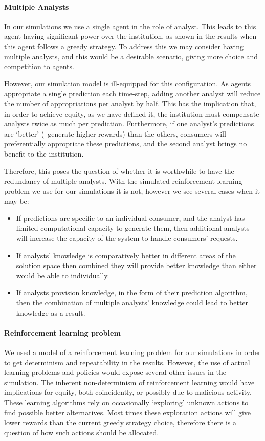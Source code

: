 \paragraph{Multiple Analysts}  In our simulations we use a single agent in the
role of analyst. This leads to this agent having significant power over the
institution, as shown in the results when this agent follows a greedy
strategy. To address this we may consider having multiple analysts, and this
would be a desirable scenario, giving more choice and competition to agents.

However, our simulation model is ill-equipped for this configuration. As
agents appropriate a single prediction each time-step, adding another
analyst will reduce the number of appropriations per analyst by half. This has
the implication that, in order to achieve equity, as we have defined it, the
institution must compensate analysts twice as much per prediction.
Furthermore, if one analyst's predictions are `better' (\ie\ generate higher rewards) than the others, consumers will preferentially appropriate these
predictions, and the second analyst brings no benefit to the institution.

Therefore, this poses the question of whether it is worthwhile to have the
redundancy of multiple analysts. With the simulated reinforcement-learning
problem we use for our simulations it is not, however we see several cases when
it may be:

\begin{itemize}
\item If predictions are specific to an individual consumer, and the analyst has limited computational capacity to generate them, then additional analysts will increase the capacity of the system to handle consumers' requests.
\item If analysts' knowledge is comparatively better in different areas of the solution space then combined they will provide better knowledge than either would be able to individually.
\item If analysts provision knowledge, in the form of their prediction algorithm, then the combination of multiple analysts' knowledge could lead to better knowledge as a result. 
\end{itemize}

\paragraph{Reinforcement learning problem} We used a model of a reinforcement
learning problem for our simulations in order to get determinism and
repeatability in the results. However, the use of actual learning problems and
policies would expose several other issues in the simulation. The inherent
non-determinism of reinforcement learning would have implications for equity,
both coincidently, or possibly due to malicious activity. These learning
algorithms rely on occasionally `exploring' unknown actions to find possible
better alternatives. Most times these exploration actions will give lower
rewards than the current greedy strategy choice, therefore there is a question
of how such actions should be allocated.

